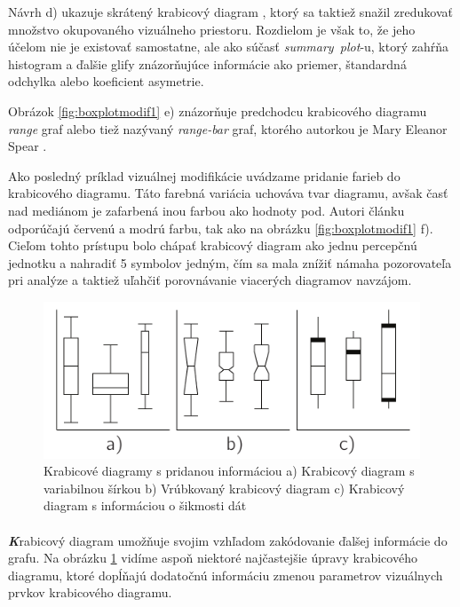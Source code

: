 Návrh d) ukazuje skrátený krabicový diagram \cite{VisualSummaryPotter}, ktorý sa taktiež snažil zredukovať množstvo okupovaného vizuálneho priestoru. Rozdielom je však to, že jeho účelom nie je existovať samostatne, ale ako súčasť \mbox{\textit{summary plot}-u}, ktorý zahŕňa histogram a ďalšie glify znázorňujúce informácie ako priemer, štandardná odchylka alebo koeficient asymetrie.

Obrázok \ref{fig:boxplotmodif1} e) znázorňuje predchodcu krabicového diagramu \textit{range} graf alebo tiež nazývaný \mbox{\textit{range-bar}} graf, ktorého autorkou je Mary Eleanor Spear \cite{Spear}.

Ako posledný príklad vizuálnej modifikácie uvádzame pridanie farieb do krabicového diagramu. Táto farebná variácia uchováva tvar diagramu, avšak časť nad mediánom je zafarbená inou farbou ako hodnoty pod. Autori článku odporúčajú červenú a modrú farbu, tak ako na obrázku \ref{fig:boxplotmodif1} f). Cieľom tohto prístupu bolo chápať krabicový diagram ako jednu percepčnú jednotku a nahradiť 5 symbolov jedným, čím sa mala znížiť námaha pozorovateľa pri analýze a taktiež uľahčiť porovnávanie viacerých diagramov navzájom. 

\begin{figure}
	\centering
	\includegraphics[width = 6in]{boxplot3}
	\caption{Krabicové diagramy s pridanou informáciou a) Krabicový diagram s variabilnou šírkou \cite{McGill} b) Vrúbkovaný krabicový diagram \cite{McGill} c) Krabicový diagram s informáciou o šikmosti dát \cite{Chamnein}}
	\label{fig:boxplotmodif2}
\end{figure}

\paragraph{}
{\large \textbf{\textit{K}}}rabicový diagram umožňuje svojim vzhľadom zakódovanie ďalšej informácie do grafu. Na obrázku \ref{fig:boxplotmodif2} vidíme aspoň niektoré najčastejšie úpravy krabicového diagramu, ktoré dopĺňajú dodatočnú informáciu zmenou parametrov vizuálnych prvkov krabicového diagramu.

